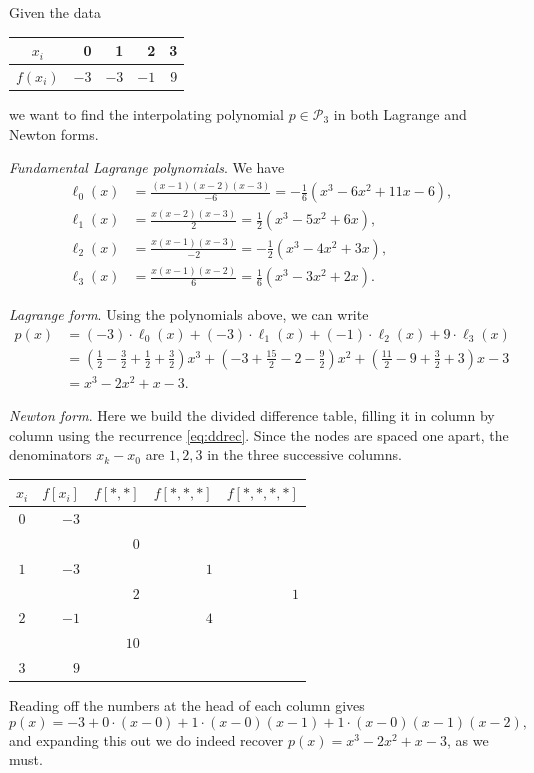 \documentclass[a4paper]{scrartcl}
\begin{document}
\begin{example}
  Given the data
  \begin{center}
    \begin{tabular}{c|r|r|r|r}
      $x_{i}$ & 0 & 1 & 2 & 3 \\
      \hline$f\left(x_{i}\right)$ & $-3$ & $-3$ & $-1$ & 9
      \end{tabular}
  \end{center}
  we want to find the interpolating polynomial $p \in \mathcal{P}_3$ in both Lagrange and Newton forms.

  \emph{Fundamental Lagrange polynomials}. We have
  \begin{align*}
      \ell_{0}(x)&=\frac{(x-1)(x-2)(x-3)}{-6}=-\frac{1}{6}\left(x^{3}-6 x^{2}+11 x-6\right), \\
      \ell_{1}(x)&=\frac{x(x-2)(x-3)}{2}=\frac{1}{2}\left(x^{3}-5 x^{2}+6 x\right), \\
      \ell_{2}(x)&=\frac{x(x-1)(x-3)}{-2}=-\frac{1}{2}\left(x^{3}-4 x^{2}+3 x\right), \\
      \ell_{3}(x)&=\frac{x(x-1)(x-2)}{6}=\frac{1}{6}\left(x^{3}-3 x^{2}+2 x\right) .
  \end{align*}

  \emph{Lagrange form}. Using the polynomials above, we can write
  \begin{align*}
      p(x) &=(-3) \cdot \ell_{0}(x)+(-3) \cdot \ell_{1}(x)+(-1) \cdot \ell_{2}(x)+9 \cdot \ell_{3}(x) \\
      &=\left(\frac{1}{2}-\frac{3}{2}+\frac{1}{2}+\frac{3}{2}\right) x^{3}+\left(-3+\frac{15}{2}-2-\frac{9}{2}\right) x^{2}+\left(\frac{11}{2}-9+\frac{3}{2}+3\right) x-3 \\
      &=x^{3}-2 x^{2}+x-3 .
  \end{align*}

  \emph{Newton form}. Here we build the divided difference table, filling it in column by column using the recurrence \eqref{eq:ddrec}. Since the nodes are spaced one apart, the denominators $x_k - x_0$ are $1, 2, 3$ in the three successive columns.
  \begin{center}
    \begin{tabular}{crrrr}
      \toprule
      $x_i$ & $f[x_i]$ & $f[*,*]$ & $f[*,*,*]$ & $f[*,*,*,*]$\\
      \midrule
      $0$ & $-3$ \\
          &      & $0$ \\
      $1$ & $-3$ &     & $1$\\
          &      & $2$ &     & $1$\\
      $2$ & $-1$ &     & $4$\\
          &      & $10$\\
      $3$ & $9$\\
      \bottomrule
    \end{tabular}
  \end{center}
  Reading off the numbers at the head of each column gives
  $$
  p(x) = -3 + 0 \cdot (x - 0) + 1 \cdot (x-0)(x-1) + 1\cdot (x-0)(x-1)(x-2),
  $$
  and expanding this out we do indeed recover $p(x) = x^3 - 2x^2 + x - 3$, as we must.
\end{example}
\end{document}
